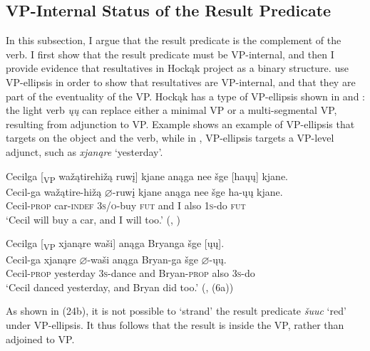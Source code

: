 \documentclass[output=paper]{LSP/langsci}
\begin{document}
\subsection{VP-Internal Status of the Result Predicate}\label{sec:rosen:3.2}

In this subsection, I argue that the result predicate is the complement of the verb. I first show that the result predicate must be VP-internal, and then I provide evidence that resultatives in Hockąk project as a binary structure. \citet{LevinRappaportHovav1995} use VP-ellipsis in order to show that resultatives are VP-internal, and that they are part of the eventuality of the VP. Hockąk has a type of VP-ellipsis shown in  and : the light verb \textit{ųų} can replace either a minimal VP or a multi-segmental VP, resulting from adjunction to VP. Example  shows an example of VP-ellipsis that targets on the object and the verb, while in , VP-ellipsis targets a VP-level adjunct, such as \textit{xjanąre} `yesterday'.

\begin{exe}
\ex \label{ex:rosen:22}
\glll Cecilga [\textsubscript{VP} wažątirehižą ruwį] kjane anąga nee šge [haųų] kjane.\\
Cecil-ga {} wažątire-hižą {$\varnothing$}-ruwį kjane anąga nee šge ha-ųų kjane.\\
Cecil-\textsc{prop} {} car-\textsc{indef} \textsc{3s/o}-buy \textsc{fut} and I also \textsc{1s}-do \textsc{fut}\\
\glt `Cecil will buy a car, and I will too.' (\citealt{Johnson2013}, )

\ex \label{ex:rosen:23}
\glll Cecilga [\textsubscript{VP} xjanąre waši] anąga Bryanga šge [ųų].\\
Cecil-ga {} xjanąre {$\varnothing$}-waši anąga Bryan-ga šge {$\varnothing$}-ųų.\\
Cecil-\textsc{prop} {} yesterday \textsc{3s}-dance and Bryan-\textsc{prop} also \textsc{3s}-do\\
\glt `Cecil danced yesterday, and Bryan did too.' (\citealt{Johnson2013}, (6a))

\end{exe}

As shown in (24b), it is not possible to `strand' the result predicate \textit{šuuc} `red' under VP-ellipsis. It thus follows that the result is inside the VP, rather than adjoined to VP.
\end{document}
